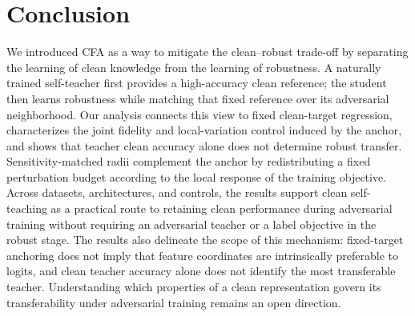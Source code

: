 \documentclass{article} %
\theoremstyle{plain}
\begin{document}
\section{Conclusion}
We introduced CFA as a way to mitigate the clean--robust trade-off by
separating the learning of clean knowledge from the learning of robustness. A
naturally trained self-teacher first provides a high-accuracy clean reference;
the student then learns robustness while matching that fixed reference over
its adversarial neighborhood. Our analysis connects this view to fixed
clean-target regression, characterizes the joint fidelity and local-variation
control induced by the anchor, and shows that teacher clean accuracy alone
does not determine robust transfer. Sensitivity-matched radii complement the
anchor by redistributing a fixed perturbation budget according to the local
response of the training objective. Across datasets, architectures, and
controls, the results support clean self-teaching as a practical route to
retaining clean performance during adversarial training without requiring an
adversarial teacher or a label objective in the robust stage. The results also
delineate the scope of this mechanism: fixed-target anchoring does not imply
that feature coordinates are intrinsically preferable to logits, and clean
teacher accuracy alone does not identify the most transferable teacher.
Understanding which properties of a clean representation govern its
transferability under adversarial training remains an open direction.

\clearpage




\end{document}
